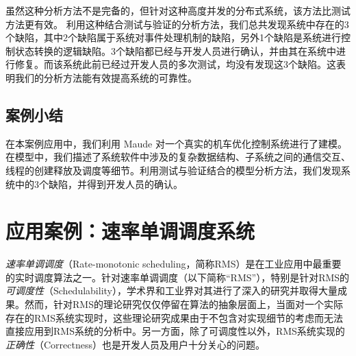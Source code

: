 虽然这种分析方法不是完备的，但针对这种高度并发的分布式系统，该方法比测试方法更有效。
利用这种结合测试与验证的分析方法，我们总共发现系统中存在的3个缺陷，其中2个缺陷属于系统对事件处理机制的缺陷，另外1个缺陷是系统进行控制状态转换的逻辑缺陷。3个缺陷都已经与开发人员进行确认，并由其在系统中进行修复。而该系统此前已经过开发人员的多次测试，均没有发现这3个缺陷。这表明我们的分析方法能有效提高系统的可靠性。


\subsection{案例小结}

在本案例应用中，我们利用 Maude 对一个真实的机车优化控制系统进行了建模。在模型中，我们描述了系统软件中涉及的复杂数据结构、子系统之间的通信交互、线程的创建释放及调度等细节。利用测试与验证结合的模型分析方法，我们发现系统中的3个缺陷，并得到开发人员的确认。

 
\section{应用案例：速率单调调度系统}
\label{s:RMS}

\hide{
\usepackage{graphicx}
\usepackage[noadjust]{cite}
\usepackage{picinpar}
\usepackage{amsmath}
\usepackage{stfloats}
\usepackage{url}
\usepackage{flushend}
\usepackage[latin1]{inputenc}
\usepackage{colortbl}
\usepackage{soul}
\usepackage{multirow}
\usepackage{pifont}
\usepackage{color}
\usepackage[hidelinks,bookmarks=false]{hyperref}
\usepackage{enumerate}
\usepackage{siunitx}
\usepackage{breakurl}
\usepackage{epstopdf}
\usepackage{pbox}
}


\hide{
\makeatletter
\def\verbatim{\small\@verbatim \frenchspacing\@vobeyspaces \@xverbatim}
\makeatother
}


\emph{速率单调调度}（Rate-monotonic scheduling，简称RMS）是在工业应用中最重要的实时调度算法之一。针对速率单调调度（以下简称“RMS”），特别是针对RMS的\emph{可调度性}（Schedulability），学术界和工业界对其进行了深入的研究并取得大量成果。然而，针对RMS的理论研究仅仅停留在算法的抽象层面上，当面对一个实际存在的RMS系统实现时，这些理论研究成果由于不包含对实现细节的考虑而无法直接应用到RMS系统的分析中。另一方面，除了可调度性以外，RMS系统实现的\emph{正确性}（Correctness）也是开发人员及用户十分关心的问题。

